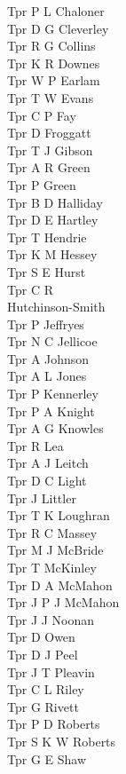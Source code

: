 \begin{multicols}{4}
  Tpr P L Chaloner \\
  Tpr D G Cleverley \\
  Tpr R G Collins \\
  Tpr K R Downes \\
  Tpr W P Earlam \\
  Tpr T W Evans \\
  Tpr C P Fay \\
  Tpr D Froggatt \\
  Tpr T J Gibson \\
  Tpr A R Green \\
  Tpr P Green \\
  Tpr B D Halliday \\
  Tpr D E Hartley \\
  Tpr T Hendrie \\
  Tpr K M Hessey \\
  Tpr S E Hurst \\
  Tpr C R \\ \indent Hutchinson-Smith \\
  Tpr P Jeffryes \\
  Tpr N C Jellicoe \\
  Tpr A Johnson \\
  Tpr A L Jones \\
  Tpr P Kennerley \\
  Tpr P A Knight \\
  Tpr A G Knowles \\
  Tpr R Lea \\
  Tpr A J Leitch \\
  Tpr D C Light \\
  Tpr J Littler \\
  Tpr T K Loughran \\
  Tpr R C Massey \\
  Tpr M J McBride \\
  Tpr T McKinley \\
  Tpr D A McMahon \\
  Tpr J P J McMahon \\
  Tpr J J Noonan \\
  Tpr D Owen \\
  Tpr D J Peel \\
  Tpr J T Pleavin \\
  Tpr C L Riley \\
  Tpr G Rivett \\
  Tpr P D Roberts \\
  Tpr S K W Roberts \\
  Tpr G E Shaw \\

\end{multicols}
